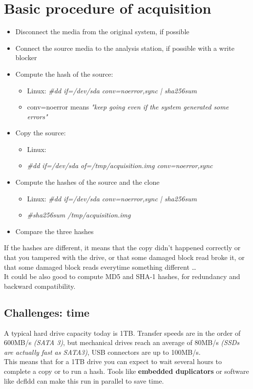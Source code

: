 \section{Basic procedure of acquisition}
    \begin{itemize}
        \item Disconnect the media from the original system, if possible
        \item Connect the source media to the analysis station, if possible with a write blocker 
        \item Compute the hash of the source:
        \begin{itemize}
            \item Linux: \textit{\#dd if=/dev/sda conv=noerror,sync | sha256sum}
            \item conv=noerror means \textit{"keep going even if the system generated some errors"}
        \end{itemize}
        \item Copy the source:
        \begin{itemize}
            \item Linux:
            \item \textit{\#dd if=/dev/sda of=/tmp/acquisition.img conv=noerror,sync}
        \end{itemize}
        \item Compute the hashes of the source and the clone
        \begin{itemize}
            \item Linux: \textit{\#dd if=/dev/sda conv=noerror,sync | sha256sum}
            \item \textit{\#sha256sum /tmp/acquisition.img}
        \end{itemize}
        \item Compare the three hashes
    \end{itemize}
    If the hashes are different, it means that the copy didn't happened correctly or that you tampered with the drive, or that some damaged block read broke it, or that some damaged block reads everytime something different \dots \\
    It could be also good to compute MD5 and SHA-1 hashes, for redundancy and backward compatibility.
    \subsection{Challenges: time}
        A typical hard drive capacity today is 1TB. Transfer speeds are in the order of 600MB/s \textit{(SATA 3)}, but mechanical drives reach an average of 80MB/s \textit{(SSDs are actually fast as SATA3)}, USB connectors are up to 100MB/s.\\
        This means that for a 1TB drive you can expect to wait several hours to complete a copy or to run a hash. Tools like \textbf{embedded duplicators} or software like dcfldd can make this run in parallel to save time.
